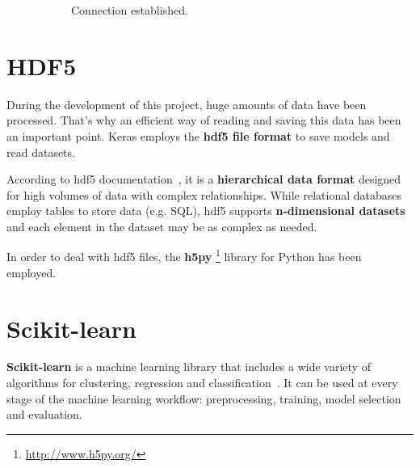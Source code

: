 \begin{figure}
\begin{subfigure}{0.33\textwidth}
		\caption{Connection established.}
		\label{fig:droidpost}
	\end{subfigure}
	\caption[DroidCam usage.]{}
	\label{fig:droidcam}
\end{figure}

\section{HDF5}\label{sec:hdf}
During the development of this project, huge amounts of data have been processed. That's why an efficient way of reading and saving this data has been an important point. Keras employs the \textbf{\gls{hdf5} file format} to save models and read datasets.

According to \gls{hdf5} documentation~\cite{hdf5}, it is a \textbf{hierarchical data format} designed for high volumes of data with complex relationships. While relational databases employ tables to store data (e.g. SQL), \gls{hdf5} supports \textbf{n-dimensional datasets} and each element in the dataset may be as complex as needed.

In order to deal with \gls{hdf5} files, the \textbf{h5py} \footnote{\url{http://www.h5py.org/}} library for Python has been employed.

\section{Scikit-learn}\label{sec:sklearn}
\textbf{Scikit-learn} is a machine learning library that includes a wide variety of algorithms for clustering, regression and classification~\cite{scikit-learn}. It can be used at every stage of the machine learning workflow: preprocessing, training, model selection and evaluation.

